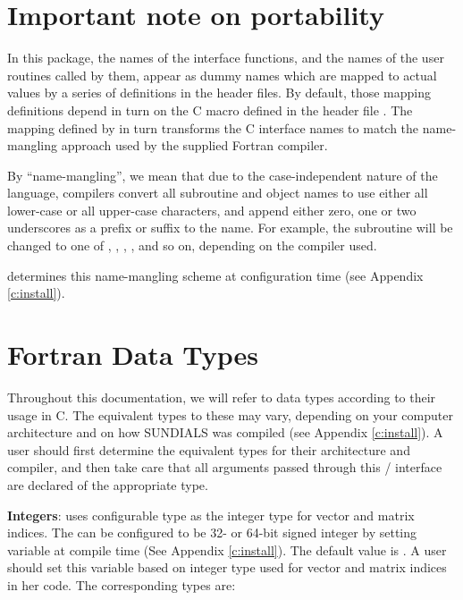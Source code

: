 
\section{Important note on portability}
In this package, the names of the interface functions, and the names
of the {\F} user routines called by them, appear as dummy names
which are mapped to actual values by a series of definitions in the
header files.  By default, those mapping definitions depend in turn
on the C macro  defined in the header file
.  
The mapping defined by  in turn
transforms the C interface names to match the name-mangling approach
used by the supplied Fortran compiler.

By ``name-mangling'', we mean that due to the case-independent nature of
the {\F} language, {\F} compilers convert all subroutine and
object names to use either all lower-case or all upper-case
characters, and append either zero, one or two underscores as a prefix
or suffix to the name.  For example, the {\F} subroutine
 will be changed to one of ,
, , , and so on,
depending on the {\F} compiler used.

{\sundials} determines this name-mangling scheme at configuration time
(see Appendix \ref{c:install}).

\section{Fortran Data Types}\label{ss:fcdata}
Throughout this documentation, we will refer to data types according
to their usage in C.  The equivalent types to these may vary,
depending on your computer architecture and on how SUNDIALS was
compiled (see Appendix \ref{c:install}).  A {\F} user should first
determine the equivalent types for their architecture and compiler,
and then take care that all arguments passed through this {\F}/{\CC}
interface are declared of the appropriate type.

\textbf{Integers}: {\sundials} uses configurable  type as the
integer type for vector and matrix indices. The  can
be configured to be 32- or 64-bit signed integer by setting variable
 at compile time (See Appendix \ref{c:install}).
The default value is .
A {\F} user should set this variable based on integer type used for
vector and matrix indices in her {\F} code. The corresponding {\F}
types are:

